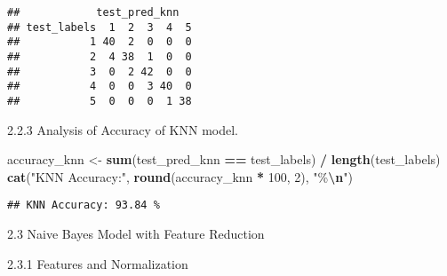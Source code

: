 \documentclass[
]{article}
\newenvironment{Shaded}{\begin{snugshade}}{\end{snugshade}}
\newcommand{\AttributeTok}[1]{\textcolor[rgb]{0.13,0.29,0.53}{#1}}
\newcommand{\CommentTok}[1]{\textcolor[rgb]{0.56,0.35,0.01}{\textit{#1}}}
\newcommand{\ConstantTok}[1]{\textcolor[rgb]{0.56,0.35,0.01}{#1}}
\newcommand{\DecValTok}[1]{\textcolor[rgb]{0.00,0.00,0.81}{#1}}
\newcommand{\FloatTok}[1]{\textcolor[rgb]{0.00,0.00,0.81}{#1}}
\newcommand{\FunctionTok}[1]{\textcolor[rgb]{0.13,0.29,0.53}{\textbf{#1}}}
\newcommand{\NormalTok}[1]{#1}
\newcommand{\OtherTok}[1]{\textcolor[rgb]{0.56,0.35,0.01}{#1}}
\newcommand{\SpecialCharTok}[1]{\textcolor[rgb]{0.81,0.36,0.00}{\textbf{#1}}}
\newcommand{\StringTok}[1]{\textcolor[rgb]{0.31,0.60,0.02}{#1}}
\begin{document}
\begin{verbatim}
##            test_pred_knn
## test_labels  1  2  3  4  5
##           1 40  2  0  0  0
##           2  4 38  1  0  0
##           3  0  2 42  0  0
##           4  0  0  3 40  0
##           5  0  0  0  1 38
\end{verbatim}

2.2.3 Analysis of Accuracy of KNN model.

\begin{Shaded}
\begin{Highlighting}[]
\NormalTok{accuracy\_knn }\OtherTok{\textless{}{-}} \FunctionTok{sum}\NormalTok{(test\_pred\_knn }\SpecialCharTok{==}\NormalTok{ test\_labels) }\SpecialCharTok{/} \FunctionTok{length}\NormalTok{(test\_labels)}
\FunctionTok{cat}\NormalTok{(}\StringTok{"KNN Accuracy:"}\NormalTok{, }\FunctionTok{round}\NormalTok{(accuracy\_knn }\SpecialCharTok{*} \DecValTok{100}\NormalTok{, }\DecValTok{2}\NormalTok{), }\StringTok{"\%}\SpecialCharTok{\textbackslash{}n}\StringTok{"}\NormalTok{)}
\end{Highlighting}
\end{Shaded}

\begin{verbatim}
## KNN Accuracy: 93.84 %
\end{verbatim}

2.3 Naive Bayes Model with Feature Reduction

2.3.1 Features and Normalization

\begin{Shaded}
\end{Shaded}
\end{document}
